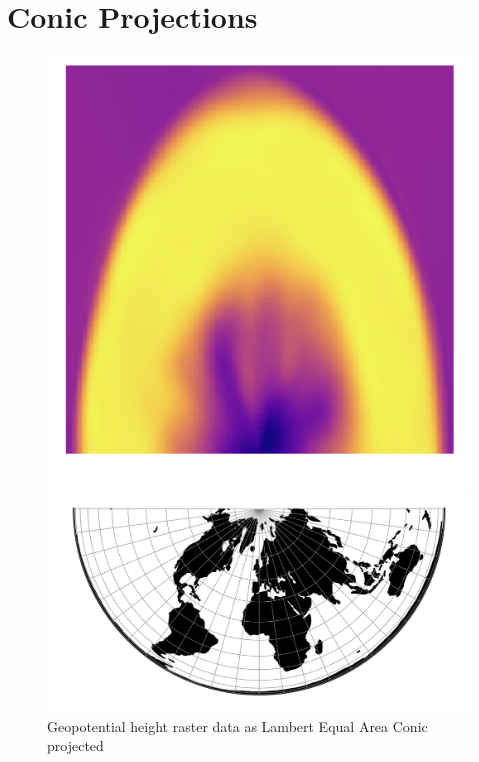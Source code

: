 \newpage
\section{Conic Projections}
\begin{figure}[H]
    \centering
    \begin{minipage}{0.30\textwidth}
        \centering
        \includegraphics[width=0.9\linewidth]{figures/chapter-8/geopoth_leac.png}
        \caption{ Geopotential height raster data as Lambert Equal Area Conic projected}
        \label{fig:leac_geopoth_raster}
    \end{minipage}\hfill
    \begin{minipage}{0.30\textwidth}
        \centering
        \includegraphics[width=0.9\linewidth]{figures/chapter-8/leac.png}

\end{minipage}
\end{figure}
